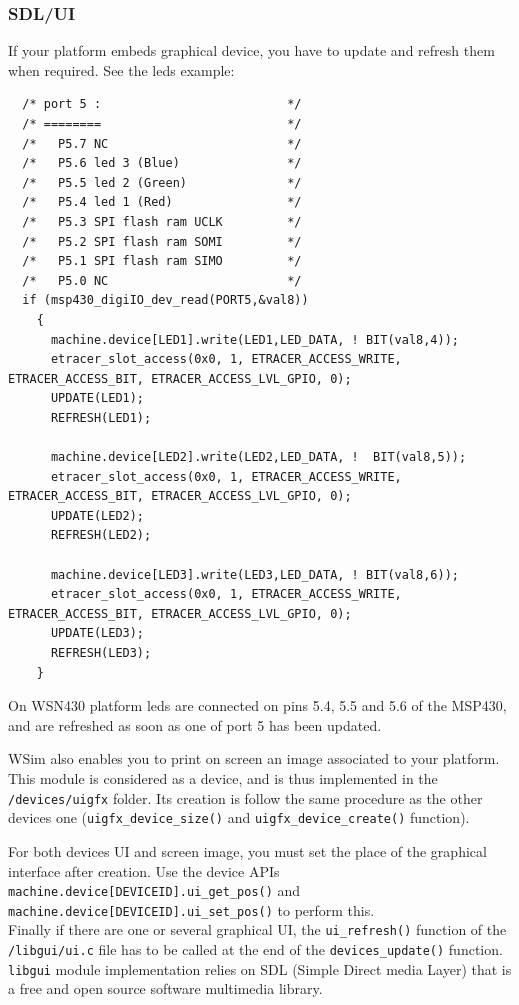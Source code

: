 \documentclass[a4paper,10pt]{report}
\begin{document}
\subsubsection{SDL/UI}
\label{SDL-UI}
If your platform embeds graphical device, you have to update and refresh them when required. See the leds example:
\begin{verbatim}
  /* port 5 :                          */
  /* ========                          */
  /*   P5.7 NC                         */
  /*   P5.6 led 3 (Blue)               */
  /*   P5.5 led 2 (Green)              */
  /*   P5.4 led 1 (Red)                */
  /*   P5.3 SPI flash ram UCLK         */
  /*   P5.2 SPI flash ram SOMI         */
  /*   P5.1 SPI flash ram SIMO         */
  /*   P5.0 NC                         */
  if (msp430_digiIO_dev_read(PORT5,&val8))
    {
      machine.device[LED1].write(LED1,LED_DATA, ! BIT(val8,4));
      etracer_slot_access(0x0, 1, ETRACER_ACCESS_WRITE, ETRACER_ACCESS_BIT, ETRACER_ACCESS_LVL_GPIO, 0);
      UPDATE(LED1);
      REFRESH(LED1);

      machine.device[LED2].write(LED2,LED_DATA, !  BIT(val8,5));
      etracer_slot_access(0x0, 1, ETRACER_ACCESS_WRITE, ETRACER_ACCESS_BIT, ETRACER_ACCESS_LVL_GPIO, 0);
      UPDATE(LED2);
      REFRESH(LED2);

      machine.device[LED3].write(LED3,LED_DATA, ! BIT(val8,6));
      etracer_slot_access(0x0, 1, ETRACER_ACCESS_WRITE, ETRACER_ACCESS_BIT, ETRACER_ACCESS_LVL_GPIO, 0);
      UPDATE(LED3);
      REFRESH(LED3);
    }
\end{verbatim}
On WSN430 platform leds are connected on pins 5.4, 5.5 and 5.6 of the MSP430, and are refreshed as soon as one of port 5 has been updated.

WSim also enables you to print on screen an image associated to your platform. This module is considered as a device, and is thus implemented in the \verb$/devices/uigfx$ folder. Its creation is follow the same procedure as the other devices one (\verb$uigfx_device_size()$ and \verb$uigfx_device_create()$ function).

For both devices UI and screen image, you must set the place of the graphical interface after creation. Use the device APIs \verb$machine.device[DEVICEID].ui_get_pos()$ and \verb$machine.device[DEVICEID].ui_set_pos()$ to perform this.\\

Finally if there are one or several graphical UI, the \verb$ui_refresh()$ function of the \verb$/libgui/ui.c$ file has to be called at the end of the \verb$devices_update()$ function. \verb$libgui$ module implementation relies on SDL (Simple Direct media Layer) that is a free and open source software multimedia library.
\end{document}
